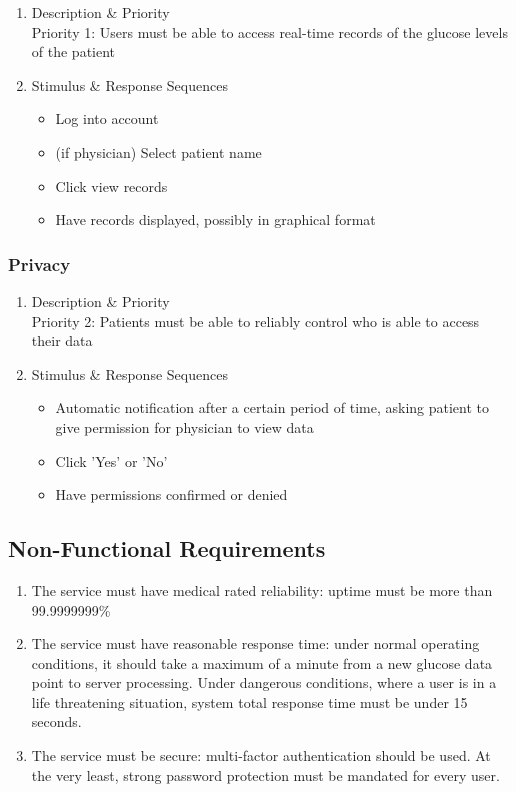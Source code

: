 \documentclass[12pt]{article}
\begin{document}
\begin{enumerate}
    \item Description \& Priority\\
    Priority 1: Users must be able to access real-time records of the glucose levels of the patient
    \item Stimulus \& Response Sequences
    \begin{itemize}
        \item Log into account
        \item (if physician) Select patient name
        \item Click view records
        \item Have records displayed, possibly in graphical format
    \end{itemize}
\end{enumerate}

\subsubsection{Privacy}

\begin{enumerate}
    \item Description \& Priority\\
    Priority 2: Patients must be able to reliably control who is able to access their data
    \item Stimulus \& Response Sequences
    \begin{itemize}
        \item Automatic notification after a certain period of time, asking patient to give permission for
        physician to view data
        \item Click 'Yes' or 'No'
        \item Have permissions confirmed or denied
    \end{itemize}
\end{enumerate}

\subsection{Non-Functional Requirements}

\begin{enumerate}
    \item The service must have medical rated reliability: uptime must be more than 99.9999999\%
    \item The service must have reasonable response time: under normal operating conditions, it should take a maximum
    of a minute from a new glucose data point to server processing. Under dangerous conditions, where a user is in a
    life threatening situation, system total response time must be under 15 seconds.
    \item The service must be secure: multi-factor authentication should be used. At the very least, strong
    password protection must be mandated for every user.
\end{enumerate}
\end{document}

